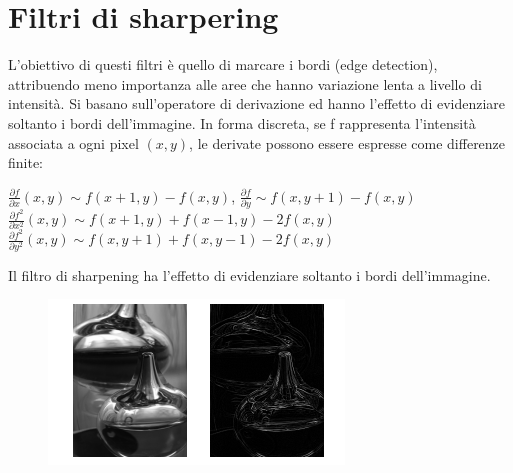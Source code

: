 \section{Filtri di sharpering}
L'obiettivo di questi filtri è quello di marcare i bordi (edge detection), attribuendo meno importanza alle aree che hanno variazione lenta a livello di intensità.
Si basano sull'operatore di derivazione ed hanno l'effetto di evidenziare soltanto i bordi dell'immagine. In forma discreta, se f rappresenta l'intensità associata a ogni pixel
$(x,y)$, le derivate possono essere espresse come differenze finite:
\begin{center}
    $\frac{\partial{f}}{\partial{x}}(x,y) \sim f(x+1, y) − f(x, y)$, $\frac{\partial{f}}{\partial{y}} \sim f(x,y+1) − f(x,y)$
    \\
    $\frac{\partial{f^2}}{\partial{x^2}}(x,y) \sim f(x+1,y) + f(x-1, y) - 2f(x,y)$
    \\
    $\frac{\partial{f^2}}{\partial{y^2}}(x,y) \sim f(x,y+1) + f(x, y-1) - 2f(x,y)$
\end{center}
Il filtro di sharpening ha l'effetto di evidenziare soltanto i bordi dell'immagine.

\begin{figure}[H]
    \centering
    \includegraphics[width=\linewidth, keepaspectratio]{capitoli/immagini/imgs/sharpening.png}
\end{figure}

